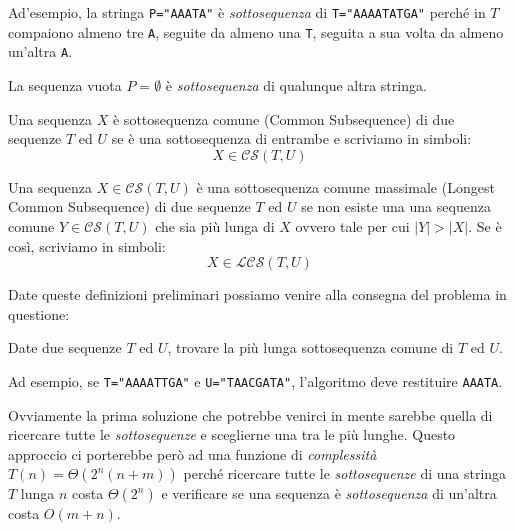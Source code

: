\noindent
Ad'esempio, la stringa \texttt{P="AAATA"} è \emph{sottosequenza} di
\texttt{T="AAAATATGA"} perché in $T$ compaiono almeno tre \texttt{A}, seguite da
almeno una \texttt{T}, seguita a sua volta da almeno un'altra \texttt{A}.
\begin{note}
    La sequenza vuota $P=\emptyset$ è \emph{sottosequenza} di qualunque altra
    stringa.
\end{note}

\begin{definition}
    Una sequenza $X$ è sottosequenza comune (Common Subsequence) di due
    sequenze $T$ ed $U$ se è una sottosequenza di entrambe e scriviamo in simboli:
    \[X\in\mathcal{CS}(T,U)\]
\end{definition}

\begin{definition}
    Una sequenza $X\in\mathcal{CS}(T,U)$ è una sottosequenza comune massimale
    (Longest Common Subsequence) di due sequenze $T$ ed $U$ se non esiste una 
    una sequenza comune $Y\in\mathcal{CS}(T,U)$ che sia più lunga di $X$ ovvero
    tale per cui $|Y|>|X|$. Se è così, scriviamo in simboli:
    \[X\in\mathcal{LCS}(T,U)\]
\end{definition}\noindent
Date queste definizioni preliminari possiamo venire alla consegna del problema
in questione:
\begin{problem}
    Date due sequenze $T$ ed $U$, trovare la più lunga sottosequenza comune di
    $T$ ed $U$.
\end{problem}\noindent
Ad esempio, se \texttt{T="AAAATTGA"} e \texttt{U="TAACGATA"}, l'algoritmo deve
restituire \texttt{AAATA}.

\bigskip\noindent
Ovviamente la prima soluzione che potrebbe venirci in mente sarebbe quella di
ricercare tutte le \emph{sottosequenze} e sceglierne una tra le più lunghe.
Questo approccio ci porterebbe però ad una funzione di \emph{complessità}
$T(n)=\Theta(2^n(n+m))$ perché ricercare tutte le \emph{sottosequenze} di una
stringa $T$ lunga $n$ costa $\Theta(2^n)$ e verificare se una sequenza è
\emph{sottosequenza} di un'altra costa $O(m+n)$.

